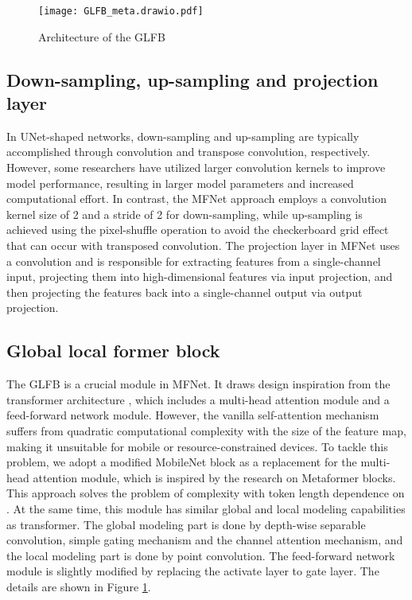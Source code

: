 \documentclass{INTERSPEECH2023}
\begin{document}
\begin{figure}[ht] \centering \texttt{[image: GLFB\_meta.drawio.pdf]} \caption{Architecture of the GLFB} \label{Fig2} \end{figure}


\subsection{Down-sampling, up-sampling and projection layer}
In UNet-shaped networks, down-sampling and up-sampling are typically accomplished through convolution and transpose convolution, respectively. However, some researchers have utilized larger convolution kernels to improve model performance, resulting in larger model parameters and increased computational effort. In contrast, the MFNet approach employs a convolution kernel size of 2 and a stride of 2 for down-sampling, while up-sampling is achieved using the pixel-shuffle operation to avoid the checkerboard grid effect that can occur with transposed convolution. The projection layer in MFNet uses a  convolution and is responsible for extracting features from a single-channel input, projecting them into high-dimensional features via input projection, and then projecting the features back into a single-channel output via output projection.

\subsection{Global local former block}
The GLFB is a crucial module in MFNet. It draws design inspiration from the transformer architecture \cite{vaswani2017attention}, which includes a multi-head attention module and a feed-forward network module. However, the vanilla self-attention mechanism suffers from quadratic computational complexity with the size of the feature map, making it unsuitable for mobile or resource-constrained devices. To tackle this problem, we adopt a modified MobileNet block as a replacement for the multi-head attention module, which is inspired by the research on Metaformer blocks. This approach solves the problem of complexity with token length dependence on . At the same time, this module has similar global and local modeling capabilities as transformer.  The global modeling part is done by depth-wise separable convolution, simple gating mechanism and the channel attention mechanism, and the local modeling part is done by point convolution. The feed-forward network module is slightly modified by replacing the activate layer to gate layer. The details are shown in Figure \ref{Fig2}.
\end{document}
